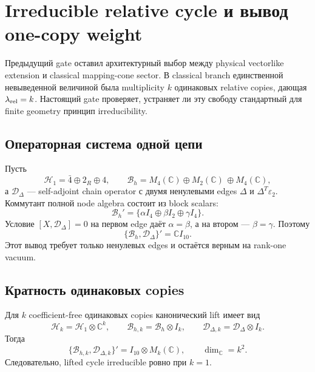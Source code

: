\section{Irreducible relative cycle и вывод one-copy weight}

Предыдущий gate оставил архитектурный выбор между physical vectorlike
extension и classical mapping-cone sector. В classical branch единственной
невыведенной величиной была multiplicity \(k\) одинаковых relative copies,
дающая \(\lambda_{\rm rel}=k\). Настоящий gate проверяет, устраняет ли эту
свободу стандартный для finite geometry принцип irreducibility.

\subsection{Операторная система одной цепи}

Пусть
\begin{equation}
 \mathcal H_1=\bar4\oplus2_R\oplus4,
 \qquad
 \mathcal B_h=M_4(\mathbb C)\oplus M_2(\mathbb C)
 \,\oplus M_4(\mathbb C),
\end{equation}
а \(\mathcal D_\Delta\) --- self-adjoint chain operator с двумя ненулевыми
edges \(\Delta\) и \(\Delta^T\varepsilon_2\). Коммутант полной node algebra
состоит из block scalars:
\begin{equation}
 \mathcal B_h'
 =\{\alpha I_4\oplus\beta I_2\oplus\gamma I_4\}.
\end{equation}
Условие \([X,\mathcal D_\Delta]=0\) на первом edge даёт
\(\alpha=\beta\), а на втором --- \(\beta=\gamma\). Поэтому
\begin{equation}
 \boxed{\{\mathcal B_h,\mathcal D_\Delta\}'=\mathbb C I_{10}.}
 \label{eq:ps-relative-one-copy-commutant}
\end{equation}
Этот вывод требует только ненулевых edges и остаётся верным на rank-one
vacuum.

\subsection{Кратность одинаковых copies}

Для \(k\) coefficient-free одинаковых copies канонический lift имеет вид
\begin{equation}
 \mathcal H_k=\mathcal H_1\otimes\mathbb C^k,
 \qquad
 \mathcal B_{h,k}=\mathcal B_h\otimes I_k,
 \qquad
 \mathcal D_{\Delta,k}=\mathcal D_\Delta\otimes I_k.
\end{equation}
Тогда
\begin{equation}
 \boxed{
 \{\mathcal B_{h,k},\mathcal D_{\Delta,k}\}'
 =I_{10}\otimes M_k(\mathbb C),
 \qquad
 \dim_\mathbb C=k^2.}
 \label{eq:ps-relative-k-copy-commutant}
\end{equation}
Следовательно, lifted cycle irreducible ровно при \(k=1\).

